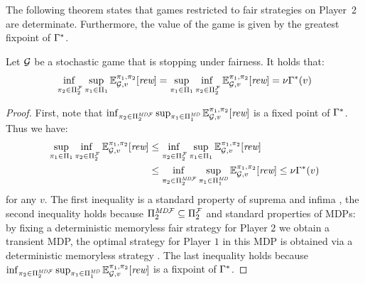 The following theorem states that games restricted to fair strategies on Player~2 are determinate.
Furthermore, the value of the game is given by the greatest fixpoint of $\Gamma^*$.
\begin{theorem}\label{th:game-determinacy} Let $\mathcal{G}$ be a stochastic game  that is stopping under fairness. It holds that:
\[\adjustlimits
	\inf_{\strat{2} \in \FairStrats{2}} \sup_{\strat{1} \in \Strategies{1}} \Expect{\strat{1}}{\strat{2}}_{\StochG,v}[\Rewards] = \adjustlimits \sup_{\strat{1} \in \Strategies{1}}   \inf_{\strat{2} \in \FairStrats{2}}  \Expect{\strat{1}}{\strat{2}}_{\StochG,v}[\Rewards] = \nu \Bellman(v)
\]
\end{theorem}
%
\begin{proof}
  First, note that   $\inf_{\pi_{2} \in \Pi^{\textit{MD}\mathcal{F}}_{2}}  \sup_{\pi_{1} \in \Pi^{\textit{MD}}_{1}} \mathbb{E}^{\pi_{1}, \pi_{2}}_{\mathcal{G},v}[\textit{rew}]$
  is a fixed point of $\Gamma^*$.  Thus we have:
   \begin{align*}	
        \adjustlimits \sup_{\strat{1} \in \Strategies{1}}   \inf_{\strat{2} \in \FairStrats{2}}  \Expect{\strat{1}}{\strat{2}}_{\StochG,v}[\Rewards]
        & \leq \adjustlimits \inf_{\strat{2} \in \FairStrats{2}} \sup_{\strat{1} \in \Strategies{1}} \Expect{\strat{1}}{\strat{2}}_{\StochG,v}[\Rewards] \\
        &   \leq \adjustlimits  \inf_{\strat{2} \in \DetMemorylessFairStrats{2}}  \sup_{\strat{1} \in \DetMemorylessStrats{1}} \Expect{\strat{1}}{\strat{2}}_{\StochG,v}[\Rewards] 
         \leq   \nu \Bellman(v) 
  \end{align*} 
  for any $v$. The first inequality is a standard property of suprema and infima \cite{Kucera2011}, the second inequality holds because  
  $\Pi^{\textit{MD}\mathcal{F}}_{2} \subseteq \Pi^{\mathcal{F}}_{2}$ and standard properties of MDPs: by fixing a deterministic memoryless  
  fair strategy for Player $2$ we obtain a transient MDP, the optimal strategy for Player $1$ in this MDP is obtained via a deterministic memoryless strategy \cite{Kallenberg83}. The last inequality holds because  $\inf_{\pi_{2} \in \Pi^{\textit{MD}\mathcal{F}}_{2}}  \sup_{\pi_{1} \in \Pi^{\textit{MD}}_{1}} \mathbb{E}^{\pi_{1}, \pi_{2}}_{\mathcal{G},v}[\textit{rew}]$ is 
  a fixpoint of $\Gamma^*$. 
  

\end{proof}

